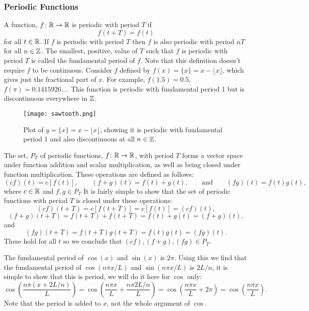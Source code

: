 \documentclass[a4paper]{article}
\begin{document}
    \subsubsection{Periodic Functions}
    A function, \(f\colon\mathbb{R}\to\mathbb{R}\) is periodic with period \(T\) if
    \[f(t + T) = f(t)\]
    for all \(t\in\mathbb{R}\).
    If \(f\) is periodic with period \(T\) then \(f\) is also periodic with period \(nT\) for all \(n\in\mathbb{Z}\).
    The smallest, positive, value of \(T\) such that \(f\) is periodic with period \(T\) is called the fundamental period of \(f\).
    Note that this definition doesn't require \(f\) to be continuous.
    Consider \(f\) defined by \(f(x) = \{x\} = x - \lfloor x \rfloor\), which gives just the fractional part of \(x\).
    For example, \(f(1.5) = 0.5\), \(f(\pi) = 0.1415926\dots\).
    This function is periodic with fundamental period 1 but is discontinuous everywhere in \(\mathbb{Z}\).
    
    \begin{figure}[ht]
        \centering
        \texttt{[image: sawtooth.png]}
        \caption{Plot of \(y = \{x\} = x - \lfloor x \rfloor\), showing it is periodic with fundamental period 1 and also discontinuous at all \(n\in\mathbb{Z}\).}
    \end{figure}
    
    The set, \(P_T\) of periodic functions, \(f\colon\mathbb{R}\to\mathbb{R}\), with period \(T\) forms a vector space under function addition and scalar multiplication, as well as being closed under function multiplication.
    These operations are defined as follows:
    \[(cf)(t) = c[f(t)],\qquad (f + g)(t) = f(t) + g(t),\qquad\text{and}\qquad (fg)(t) = f(t)g(t),\]
    where \(c\in\mathbb{R}\) and \(f, g\in P_T\)
    It is fairly simple to show that the set of periodic functions with period \(T\) is closed under these operations:
    \[(cf)(t + T) = c[f(t + T)] = c[f(t)] = (cf)(t),\]
    \[(f + g)(t + T) = f(t + T) + f(t + T) = f(t) + g(t) = (f + g)(t),\]
    and
    \[(fg)(t + T) = f(t + T)g(t + T) = f(t)g(t) = (fg)(t).\]
    These hold for all \(t\) so we conclude that \((cf), (f + g), (fg)\in P_T\).
    
    The fundamental period of \(\cos(x)\) and \(\sin(x)\) is \(2\pi\).
    Using this we find that the fundamental period of \(\cos(n\pi x/L)\) and \(\sin(n\pi x/L)\) is \(2L/n\), it is simple to show that this is period, we will do it here for \(\cos\) only:
    \[\cos\left(\frac{n\pi (x + 2L/n)}{L}\right) = \cos\left(\frac{n\pi x}{L} + \frac{n\pi2L/n}{L}\right) = \cos\left(\frac{n\pi x}{L} + 2\pi\right) = \cos\left(\frac{n\pi x}{L}\right).\]
    Note that the period is added to \(x\), not the whole argument of \(\cos\).
    
\end{document}
